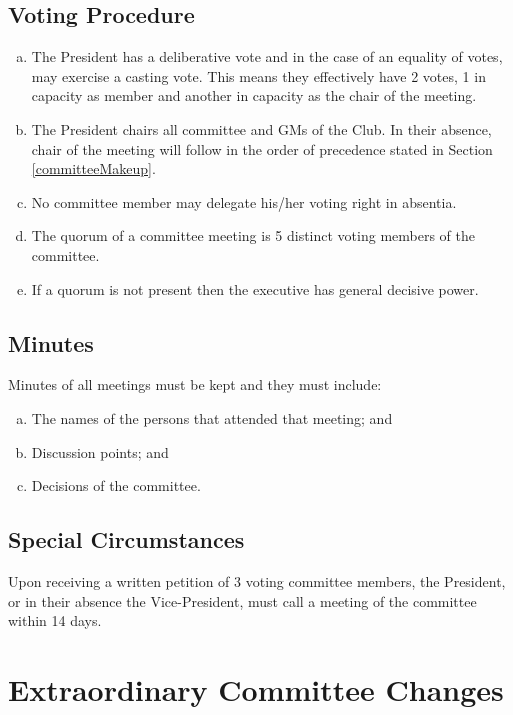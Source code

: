 \documentclass[11pt]{article}
\begin{document}
\subsection{Voting Procedure} \label{committeeMeetingVotingProcedure}
\begin{enumerate}[(a)]
    \item The President has a deliberative vote and in the case of an equality of votes, may exercise a casting vote. This means they effectively have 2 votes, 1 in capacity as member and another in capacity as the chair of the meeting.
    \item The President chairs all committee and GMs of the Club. In their absence, chair of the meeting will follow in the order of precedence stated in Section \ref{committeeMakeup}.
    \item No committee member may delegate his/her voting right in absentia.
    \item The quorum of a committee meeting is 5 distinct voting members of the committee. 
    \item If a quorum is not present then the executive has general decisive power.
\end{enumerate}

\subsection{Minutes}
Minutes of all meetings must be kept and they must include:
\begin{enumerate}[(a)]
    \item The names of the persons that attended that meeting; and
    \item Discussion points; and
    \item Decisions of the committee.
\end{enumerate}

\subsection{Special Circumstances}
Upon receiving a written petition of 3 voting committee members, the President, or in their absence the Vice-President, must call a meeting of the committee within 14 days.

\section{Extraordinary Committee Changes} \label{extraordinaryCommitteeChanges}
\end{document}

